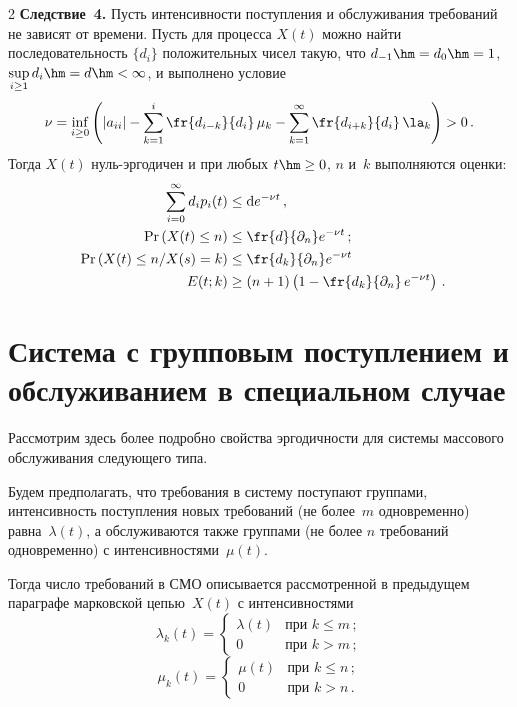 \begin{multicols}{2}
\noindent
\textbf{Следствие~4.}
Пусть интенсивности поступления и обслуживания требований не зависят от времени. 
Пусть для процесса $X\left( t\right) $ можно найти последовательность $\{d_i\}$
положительных чисел такую, что  $d_{-1}\hm=d_{0}\hm=1$, $\sup\limits_{i \ge
1} d_i \hm= {d}\hm<\infty$, и выполнено условие
\begin{equation*}
\nu = \inf\limits_{i \ge 0} \left( |a_{ii}| -\sum\limits_{k=1}^{i}\fr{d_{i-k}}{d_i}\,\mu_k 
- \sum\limits_{k=1}^{\infty} \fr{d_{i+k}}{d_i}\,\la_{k}
 \right) > 0\,.
\end{equation*}
Тогда  $X\left( t\right) $ нуль-эр\-го\-ди\-чен и при любых $t \hm\ge 0$, $n$ и~$k$
выполняются оценки:
\begin{align*}
\sum\limits_{i=0}^{\infty} d_i p_i (t) &\le
 {\rm d} e^{-\nu t}\, ,  
\\
\mathrm{Pr} \left(X(t)  \le n \right) &\le \fr{{d}}{{\partial}_n}e^{-\nu t}\,; 
\\
\enskip \mathrm{Pr} \left(X(t)  \le n / X(s) = k \right) &\le \fr{{d_k}}{{\partial}_n}e^{-\nu t}
\\
E(t;k) &\ge \left(n+1\right) \left(1 - \fr{d_k}{{\partial}_n}\,
e^{-\nu t}\right)\,.  
\end{align*}


\section{Система с групповым поступлением и обслуживанием в специальном случае}

Рассмотрим здесь более подробно свойства эргодичности для сис\-те\-мы массового 
обслуживания следующего типа.

Будем предполагать, что требования в систему поступают группами, интенсивность 
поступления новых требований (не более~$m$ одновременно) равна~$\lambda(t)$, а 
обслуживаются также группами (не более $n$ требований одновременно) с интенсивностями~$\mu (t)$.

Тогда число требований в СМО описывается рассмотренной в предыдущем параграфе марковской 
цепью~$X(t)$ с интенсивностями
\begin{equation*}
\lambda_{k}(t)= \begin{cases}
\lambda\left( t\right)   & \mbox {при } k \le m\,;  \\
0 & \mbox {при } k > m\,;
\end{cases}
\label{3001}
\end{equation*}
\begin{equation*}
\mu_{k}(t)=  \begin{cases}
\mu\left( t\right)   & \mbox {при } k \le n\,;  \\
0 & \mbox {при } k > n\,.
\end{cases}
\end{equation*}


\end{multicols}
